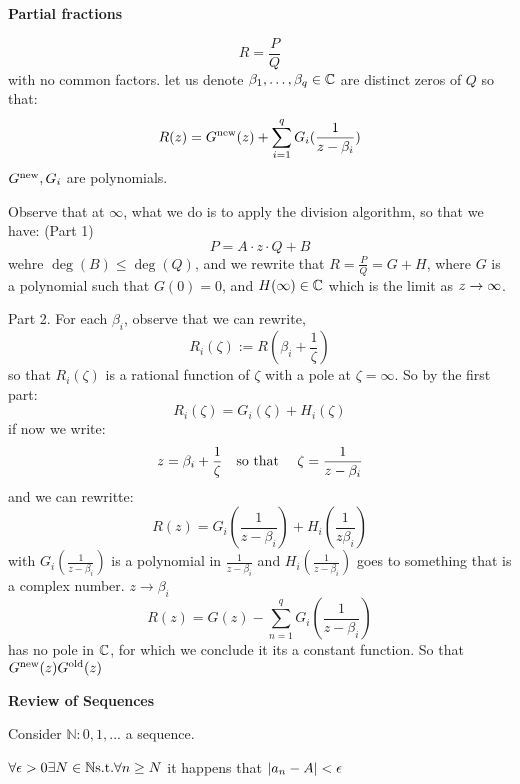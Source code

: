 \textbf{Partial fractions}

\[ R = \frac{P}{Q} \] 
with no common factors.
let us denote $\beta_1, \ldots, \beta_q \in \mathbb{C}$ are distinct zeros of $Q$
so that:
\[ R(z) = G^{\textrm{new}}(z) + \sum_{i=1}^{q} G_i (\frac{1}{z - \beta_i}) \]
$ G^{\textrm{new}}, G_i $ are polynomials.

Observe that at $ \infty $, what we do is to apply the division algorithm, so that we have: (Part 1)
\[ P = A \cdot z \cdot Q + B \]
wehre $ \operatorname{deg}(B) \leq \operatorname{deg}(Q) $, and we rewrite that $ R = \frac{P}{Q}  = G + H$, where $G$ is a polynomial such that $G(0)=0$, and $H(\infty) \in \mathbb{C}$ which is the limit as $  z \rightarrow \infty $.

Part 2. For each $\beta_i$, observe that we can rewrite, 
\[ R_i(\zeta):= R(\beta_i + \frac{1}{\zeta}) \]
so that $R_i(\zeta)$ is a rational function of $ \zeta $ with a pole at $ \zeta = \infty $. So by the first part:
\[ R_i(\zeta) = G_i(\zeta) + H_i(\zeta) \]
if now we write:
\[ z = \beta_i + \frac{1}{\zeta}  \quad \textrm{so that } \quad \zeta = \frac{1}{z - \beta_i}\]
and we can rewritte:
\[ R(z) =  G_i(\frac{1}{z - \beta_i}) + H_i(\frac{1}{z \beta_i})\]
with $G_i(\frac{1}{z- \beta_i})$ is a polynomial in $\frac{1}{z-\beta_i}  $ and $ H_i(\frac{1}{z - \beta_i}) $ goes to something that is a complex number. $ z \rightarrow \beta_i $
\[ R(z) = G(z) - \sum_{n=1}^{q} G_i (\frac{1}{z - \beta_i}) \]
has no pole in $\mathbb{C}$, for which we conclude it its a constant function. So that $ G^{\textrm{new}}(z) G^{\textrm{old}} (z) $
	
\textbf{Review of Sequences}

Consider $ \mathbb{N} : 0,1,... $ a sequence.

\begin{define}
	$ \forall \epsilon > 0 \exists N \in \mathbb{N} \textrm{s.t.} \forall n \geq N $ it happens that $ \left| a_n - A \right| < \epsilon $
\end{define}
